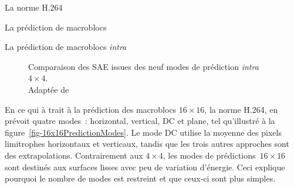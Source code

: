\begin{chapter}{La norme H.264}
\begin{section}{La prédiction de macroblocs}
\begin{subsection}{La prédiction de macroblocs \textit{intra}}
\begin{figure}
\centering
{}
\caption[SAE issues des modes neuf modes de prédiction \textit{intra}
$4 \times 4$]{Comparaison des SAE issues des neuf modes de prédiction
\textit{intra} $4 \times 4$. \\Adaptée de \citet[p.~181]{richardson2003}}
\label{fig-SAEPredictionBlocks}

\end{figure}

En ce qui à trait à la prédiction des macroblocs $16\times16$, la norme H.264,
en prévoit quatre modes~: horizontal, vertical, DC et plane, tel qu'illustré à
la figure~\ref{fig-16x16PredictionModes}. Le mode DC utilise la moyenne des
pixels limitrophes horizontaux et verticaux, tandis que les trois autres
approches sont des extrapolations. Contrairement aux $4 \times 4$, les modes de
prédictions~$16 \times 16$ sont destinés aux surfaces lisses avec peu de
variation d'énergie. Ceci explique pourquoi le nombre de modes est restreint et
que ceux-ci sont plus simples.


\end{subsection}
\end{section}
\end{chapter}
